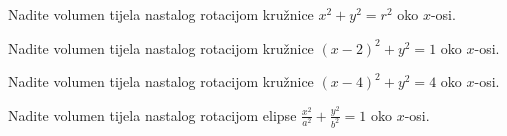 \begin{example}
    Nadite volumen tijela nastalog rotacijom kružnice $x^2+y^2=r^2$ oko $x$-osi.
\end{example}

\begin{example}
    Nadite volumen tijela nastalog rotacijom kružnice $(x-2)^2+y^2=1$ oko
    $x$-osi.
\end{example}

\begin{example}
    Nadite volumen tijela nastalog rotacijom kružnice $(x-4)^2+y^2=4$ oko
    $x$-osi.
\end{example}

\begin{example}
    Nadite volumen tijela nastalog rotacijom elipse
    $\frac{x^2}{a^2}+\frac{y^2}{b^2}=1$ oko $x$-osi.
\end{example}
